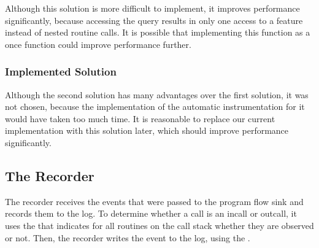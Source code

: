 Although this solution is more difficult to implement, it improves performance significantly, because accessing the query results in only one access to a feature instead of nested routine calls. It is possible that implementing this function as a once function could improve performance further.


\subsubsection {Implemented Solution}
Although the second solution has many advantages over the first solution, it was not chosen, because the implementation of the automatic instrumentation for it would have taken too much time. It is reasonable to replace our current implementation with this solution later, which should improve performance significantly.


\subsection{The Recorder}
The recorder receives the events that were passed to the program flow sink and records them to the log. To determine whether a call is an incall or outcall, it uses the  that indicates for all routines on the call stack whether they are observed or not. Then, the recorder writes the event to the log, using the .


